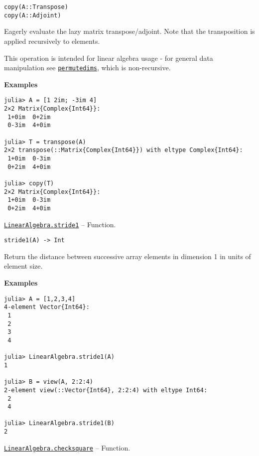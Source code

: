 \begin{adjustwidth}{2em}{0pt}


\begin{verbatim}
copy(A::Transpose)
copy(A::Adjoint)
\end{verbatim}

Eagerly evaluate the lazy matrix transpose/adjoint. Note that the transposition is applied recursively to elements.

This operation is intended for linear algebra usage - for general data manipulation see \hyperlink{10913801624539723467}{\texttt{permutedims}}, which is non-recursive.

\textbf{Examples}


\begin{verbatim}
julia> A = [1 2im; -3im 4]
2×2 Matrix{Complex{Int64}}:
 1+0im  0+2im
 0-3im  4+0im

julia> T = transpose(A)
2×2 transpose(::Matrix{Complex{Int64}}) with eltype Complex{Int64}:
 1+0im  0-3im
 0+2im  4+0im

julia> copy(T)
2×2 Matrix{Complex{Int64}}:
 1+0im  0-3im
 0+2im  4+0im
\end{verbatim}



\end{adjustwidth}
\hypertarget{17430342268269872501}{}
\hyperlink{17430342268269872501}{\texttt{LinearAlgebra.stride1}}  -- {Function.}

\begin{adjustwidth}{2em}{0pt}


\begin{verbatim}
stride1(A) -> Int
\end{verbatim}

Return the distance between successive array elements in dimension 1 in units of element size.

\textbf{Examples}


\begin{verbatim}
julia> A = [1,2,3,4]
4-element Vector{Int64}:
 1
 2
 3
 4

julia> LinearAlgebra.stride1(A)
1

julia> B = view(A, 2:2:4)
2-element view(::Vector{Int64}, 2:2:4) with eltype Int64:
 2
 4

julia> LinearAlgebra.stride1(B)
2
\end{verbatim}



\end{adjustwidth}
\hypertarget{3700476694218805076}{}
\hyperlink{3700476694218805076}{\texttt{LinearAlgebra.checksquare}}  -- {Function.}

